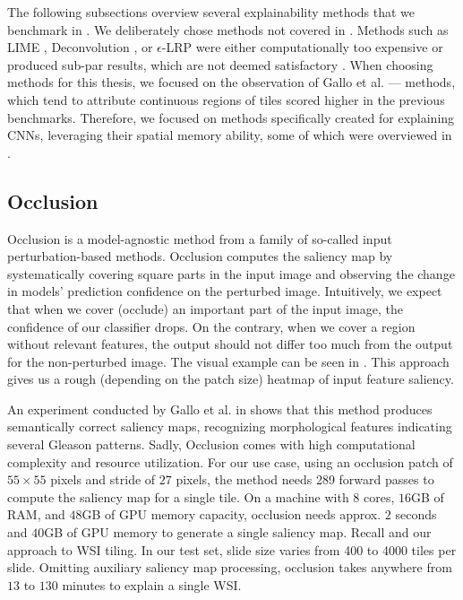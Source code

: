 The following subsections overview several explainability methods that we benchmark in .
We deliberately chose methods not covered in \cite{gallo}.
Methods such as LIME \cite{xai-husky}, Deconvolution \cite{deconvolution}, or $\epsilon$-LRP \cite{lrp}  were either computationally too expensive or produced sub-par results, which are not deemed satisfactory \cite{gallo}.
When choosing methods for this thesis, we focused on the observation of Gallo et al. \cite{gallo} --- methods, which tend to attribute continuous regions of tiles scored higher in the previous benchmarks.
Therefore, we focused on methods specifically created for explaining CNNs, leveraging their spatial memory ability, some of which were overviewed in \cite{krajnansky-grad-cam, bajger-grad-cam, hruska-grad-cam}.

\subsection{Occlusion}\label{occlusion}

Occlusion is a model-agnostic method from a family of so-called input perturbation-based methods.
Occlusion computes the saliency map by systematically covering square parts in the input image and observing the change in models' prediction confidence on the perturbed image.
Intuitively, we expect that when we cover (occlude) an important part of the input image, the confidence of our classifier drops.
On the contrary, when we cover a region without relevant features, the output should not differ too much from the output for the non-perturbed image.
The visual example can be seen in . This approach gives us a rough (depending on the patch size) heatmap of input feature saliency.

An experiment conducted by Gallo et al. in \cite{gallo} shows that this method produces semantically correct saliency maps, recognizing morphological features indicating several Gleason patterns.
Sadly, Occlusion comes with high computational complexity and resource utilization.
For our use case, using an occlusion patch of $55 \times 55$ pixels and stride of $27$ pixels, the method needs 289 forward passes to compute the saliency map for a single tile.
On a machine with $8$ cores, $16$GB of RAM, and $48$GB of GPU memory capacity, occlusion needs approx. $2$ seconds and $40$GB of GPU memory to generate a single saliency map.
Recall  and our approach to WSI tiling.
In our test set, slide size varies from 400 to 4000 tiles per slide.
Omitting auxiliary saliency map processing, occlusion takes anywhere from $13$ to $130$ minutes to explain a single WSI.


